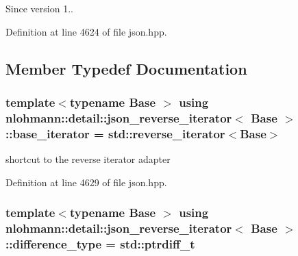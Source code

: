 \begin{DoxySince}{Since}
version 1.. 
\end{DoxySince}


Definition at line 4624 of file json.\+hpp.



\subsection{Member Typedef Documentation}
\subsubsection[{\texorpdfstring{base\+\_\+iterator}{base_iterator}}]{\setlength{\rightskip}{0pt plus 5cm}template$<$typename Base $>$ using {\bf nlohmann\+::detail\+::json\+\_\+reverse\+\_\+iterator}$<$ Base $>$\+::{\bf base\+\_\+iterator} =  std\+::reverse\+\_\+iterator$<$Base$>$}\hypertarget{classnlohmann_1_1detail_1_1json__reverse__iterator_a6b2ef1d632fe49bfcc22fbd1abd62395}{}\label{classnlohmann_1_1detail_1_1json__reverse__iterator_a6b2ef1d632fe49bfcc22fbd1abd62395}


shortcut to the reverse iterator adapter 



Definition at line 4629 of file json.\+hpp.

\subsubsection[{\texorpdfstring{difference\+\_\+type}{difference_type}}]{\setlength{\rightskip}{0pt plus 5cm}template$<$typename Base $>$ using {\bf nlohmann\+::detail\+::json\+\_\+reverse\+\_\+iterator}$<$ Base $>$\+::{\bf difference\+\_\+type} =  std\+::ptrdiff\+\_\+t}\hypertarget{classnlohmann_1_1detail_1_1json__reverse__iterator_a9ab55987c05ec6427ad36082e351cc45}{}\label{classnlohmann_1_1detail_1_1json__reverse__iterator_a9ab55987c05ec6427ad36082e351cc45}


